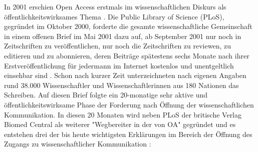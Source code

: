 In 2001 erschien Open Access erstmals im wissenschaftlichen Diskurs als öffentlichkeitswirksames Thema \cite{cite:19}. Die Public Library of Science (PLoS), gegründet im Oktober 2000, forderte die gesamte wissenschaftliche Gemeinschaft in einem offenen Brief im Mai 2001 dazu auf, ab September 2001 nur noch in Zeitschriften zu veröffentlichen, nur noch die Zeitschriften zu reviewen, zu editieren und zu abonnieren, deren Beiträge spätestens sechs Monate nach ihrer Erstveröffentlichung für jedermann im Internet kostenlos und unentgeltlich einsehbar sind \cite{cite:20}. Schon nach kurzer Zeit unterzeichneten nach eigenen Angaben \cite{cite:19a} rund 38.000 Wissenschaftler und Wissenschaftlerinnen aus 180 Nationen das Schreiben. Auf diesen Brief folgte ein 20-monatige sehr aktive und öffentlichkeitswirksame Phase der Forderung nach Öffnung der wissenschaftlichen Kommunikation. In diesen 20 Monaten wird neben PLoS der britische Verlag Biomed Central als weiterer "Wegbereiter in der von OA" \cite{suchen-Hoffmann-Zugang-undVerwertung-oeffentlicher-Informationen} gegründet und es entstehen drei der bis heute wichtigsten Erklärungen im Bereich der Öffnung des Zugangs zu wissenschaftlicher Kommunikation \cite{CREATe_2014}:
